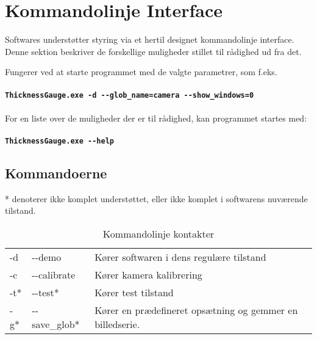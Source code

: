 \section{Kommandolinje Interface}
Softwares understøtter styring via et hertil designet kommandolinje interface. Denne sektion beskriver de forskellige muligheder stillet til rådighed ud fra det.

Fungerer ved at starte programmet med de valgte parametrer, som f.eks.\\\\
\texttt{\textbf{ThicknessGauge.exe -d -{}-glob\_name=camera -{}-show\_windows=0}}
\\\\
For en liste over de muligheder der er til rådighed, kan programmet startes med:\\\\
\texttt{\textbf{ThicknessGauge.exe -{}-help}}\\


\subsection{Kommandoerne}

* denoterer ikke komplet understøttet, eller ikke komplet i softwarens nuværende tilstand.

\begin{table}[h]
	\centering
	\label{kommandolinjekontakter}
	\begin{tabular}{lll}
	-d	& -{}-demo & Kører softwaren i dens regulære tilstand \\
	-c	& -{}-calibrate & Kører kamera kalibrering  \\
	-t*	& -{}-test*  &  Kører test tilstand \\
	-g*  & -{}-save\_glob* & Kører en prædefineret opsætning og gemmer en billedserie.
	\end{tabular}
	\caption{Kommandolinje kontakter}
\end{table}

